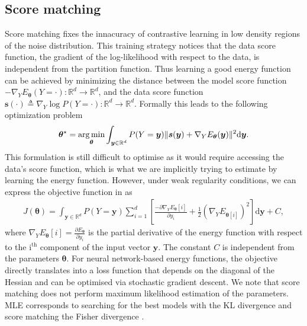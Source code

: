 
\subsection{Score matching}
Score matching \citep{hyvarinen2005estimation} fixes the innacuracy of contrastive learning in low density regions of the noise distribution. This training strategy notices that the data score function, the gradient of the log-likelihood with respect to the data, is independent from the partition function. Thus learning a good energy function can be achieved by minimizing the distance between the model score function $-\nabla_Y E_{\bm{\theta}}(Y=\cdot): \mathbb{R}^d \rightarrow \mathbb{R}^d$, and the data score function $\bm{s}(\cdot)\triangleq \nabla_Y \log P(Y=\cdot): \mathbb{R}^d \rightarrow \mathbb{R}^d$. Formally this leads to the following optimization problem
\begin{align}
  \bm{\theta}^{\star} = \operatorname*{arg\,min}_{\bm{\theta}} \int_{\bm{y} \in \mathbb{R}^d} P(Y=\bm{y}) \lVert \bm{s}(\bm{y}) + \nabla_Y E_{\bm{\theta}}(\bm{y})\rVert^2 \text{d}\bm{y}. \label{eq:score_matching}
\end{align}
This formulation is still difficult to optimise as it would require accessing the data's score function, which is what we are implicitly trying to estimate by learning the energy function. However, under weak regularity conditions, we can express the objective function in  as
\begin{align}
  J(\bm{\theta}) = \int_{\bm{y} \in \mathbb{R}^d} P(Y=\bm{y}) \sum_{i=1}^d \left[ \frac{-\partial \nabla_Y E_{\bm{\theta}}[i]}{\partial y_i } + \frac{1}{2} (\nabla_Y E_{\bm{\theta}[i]})^2 \right] \text{d}\bm{y} + C,
\end{align}
where $\nabla_Y E_{\bm{\theta}}[i] = \frac{\partial E_{\bm{\theta}}}{\partial y_i}$ is the partial derivative of the energy function with respect to the $\text{i}^{\text{th}}$ component of the input vector $\bm y$. The constant $C$ is independent from the parameters $\bm \theta$. For neural network-based energy functions, the objective directly translates into a loss function that depends on the diagonal of the Hessian and can be optimised via stochastic gradient descent. We note that score matching does not perform maximum likelihood estimation of the parameters. MLE corresponds to searching for the best models with the KL divergence and score matching the Fisher divergence \citep{lyu2012interpretation}.

